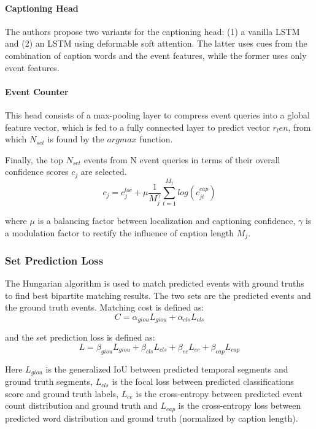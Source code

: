 \paragraph{Captioning Head} The authors propose two variants for the captioning head: (1) a vanilla LSTM and (2) an LSTM using deformable soft attention. The latter uses cues from the combination of caption words and the event features, while the former uses only event features.

\paragraph{Event Counter} This head consists of a max-pooling layer to compress event queries into a global feature vector, which is fed to a fully connected layer to predict vector $r_len$, from which $N_{set}$ is found by the $argmax$ function. 

Finally, the top $N_{set}$ events from N event queries in terms of their overall confidence scores $c_j$ are selected.
$$ c_j = c_j^{loc} + \mu \frac{1}{M_j^{\gamma}} \sum_{t=1}^{M_j}{log( c^{cap}_{jt} )} $$
\par where $\mu$ is a balancing factor between localization and captioning confidence, $\gamma$ is a modulation factor to rectify the influence of caption length $M_j$.


\subsubsection{Set Prediction Loss}
\par The Hungarian algorithm is used to match predicted events with ground truths to find best bipartite matching results. The two sets are the predicted events and the ground truth events. Matching cost is defined as:
$$ C = \alpha_{giou} L_{giou} + \alpha_{cls} L_{cls} $$
\par and the set prediction loss is defined as:
$$ L = \beta_{giou} L_{giou} + \beta_{cls} L_{cls}  + \beta_{ec} L_{ec} + \beta_{cap} L_{cap}$$

\par Here $L_{giou}$ is the generalized IoU between predicted temporal segments and ground truth segments, $L_{cls}$ is the focal loss between predicted classifications score and ground truth labels, $L_{ce}$ is the cross-entropy between predicted event count distribution and ground truth and $L_{cap}$ is the cross-entropy loss between predicted word distribution and ground truth (normalized by caption length).
